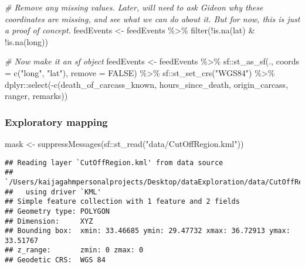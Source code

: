 \documentclass[
]{article}
\newenvironment{Shaded}{\begin{snugshade}}{\end{snugshade}}
\newcommand{\AttributeTok}[1]{\textcolor[rgb]{0.77,0.63,0.00}{#1}}
\newcommand{\CommentTok}[1]{\textcolor[rgb]{0.56,0.35,0.01}{\textit{#1}}}
\newcommand{\ConstantTok}[1]{\textcolor[rgb]{0.00,0.00,0.00}{#1}}
\newcommand{\FunctionTok}[1]{\textcolor[rgb]{0.00,0.00,0.00}{#1}}
\newcommand{\NormalTok}[1]{#1}
\newcommand{\OtherTok}[1]{\textcolor[rgb]{0.56,0.35,0.01}{#1}}
\newcommand{\SpecialCharTok}[1]{\textcolor[rgb]{0.00,0.00,0.00}{#1}}
\newcommand{\StringTok}[1]{\textcolor[rgb]{0.31,0.60,0.02}{#1}}
\begin{document}
\begin{Shaded}
\begin{Highlighting}[]
\CommentTok{\# Remove any missing values. Later, will need to ask Gideon why these coordinates are missing, and see what we can do about it. But for now, this is just a proof of concept.}
\NormalTok{feedEvents }\OtherTok{\textless{}{-}}\NormalTok{ feedEvents }\SpecialCharTok{\%\textgreater{}\%}
  \FunctionTok{filter}\NormalTok{(}\SpecialCharTok{!}\FunctionTok{is.na}\NormalTok{(lat) }\SpecialCharTok{\&} \SpecialCharTok{!}\FunctionTok{is.na}\NormalTok{(long))}

\CommentTok{\# Now make it an sf object}
\NormalTok{feedEvents }\OtherTok{\textless{}{-}}\NormalTok{ feedEvents }\SpecialCharTok{\%\textgreater{}\%}
\NormalTok{  sf}\SpecialCharTok{::}\FunctionTok{st\_as\_sf}\NormalTok{(., }\AttributeTok{coords =} \FunctionTok{c}\NormalTok{(}\StringTok{"long"}\NormalTok{, }\StringTok{"lat"}\NormalTok{), }\AttributeTok{remove =} \ConstantTok{FALSE}\NormalTok{) }\SpecialCharTok{\%\textgreater{}\%}
\NormalTok{  sf}\SpecialCharTok{::}\FunctionTok{st\_set\_crs}\NormalTok{(}\StringTok{"WGS84"}\NormalTok{) }\SpecialCharTok{\%\textgreater{}\%}
\NormalTok{  dplyr}\SpecialCharTok{::}\FunctionTok{select}\NormalTok{(}\SpecialCharTok{{-}}\FunctionTok{c}\NormalTok{(death\_of\_carcass\_known, hours\_since\_death, origin\_carcass, ranger, remarks))}
\end{Highlighting}
\end{Shaded}

\hypertarget{exploratory-mapping}{%
\subsubsection{Exploratory mapping}\label{exploratory-mapping}}

\begin{Shaded}
\begin{Highlighting}[]
\NormalTok{mask }\OtherTok{\textless{}{-}} \FunctionTok{suppressMessages}\NormalTok{(sf}\SpecialCharTok{::}\FunctionTok{st\_read}\NormalTok{(}\StringTok{"data/CutOffRegion.kml"}\NormalTok{))}
\end{Highlighting}
\end{Shaded}

\begin{verbatim}
## Reading layer `CutOffRegion.kml' from data source 
##   `/Users/kaijagahmpersonalprojects/Desktop/dataExploration/data/CutOffRegion.kml' 
##   using driver `KML'
## Simple feature collection with 1 feature and 2 fields
## Geometry type: POLYGON
## Dimension:     XYZ
## Bounding box:  xmin: 33.46685 ymin: 29.47732 xmax: 36.72913 ymax: 33.51767
## z_range:       zmin: 0 zmax: 0
## Geodetic CRS:  WGS 84
\end{verbatim}
\end{document}
